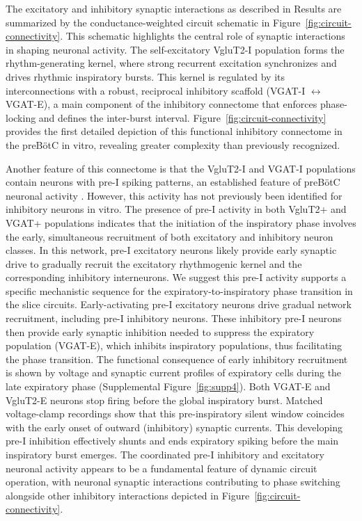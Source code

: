 \documentclass[
]{article}
\newcommand{\figref}[1]{Figure~\ref{#1}}
\newcommand{\suppfigref}[1]{Supplemental Figure~\ref{#1}}
\begin{document}
The excitatory and inhibitory synaptic interactions as described in Results are summarized by the conductance-weighted circuit schematic in \figref{fig:circuit-connectivity}. This schematic highlights the central role of synaptic interactions in shaping neuronal activity. The self-excitatory VgluT2-I population forms the rhythm-generating kernel, where strong recurrent excitation synchronizes and drives rhythmic inspiratory bursts. This kernel is regulated by its interconnections with a robust, reciprocal inhibitory scaffold (VGAT-I \(\leftrightarrow\) VGAT-E), a main component of the inhibitory connectome that enforces phase-locking and defines the inter-burst interval. \figref{fig:circuit-connectivity} provides the first detailed depiction of this functional inhibitory connectome in the preBötC in vitro, revealing greater complexity than previously recognized.

Another feature of this connectome is that the VgluT2-I and VGAT-I populations contain neurons with pre-I spiking patterns, an established feature of preBötC neuronal activity \citep[e.g.,][]{johnson1994pacemaker,butera1999coupled,delnegro2001experimental}. However, this activity has not previously been identified for inhibitory neurons in vitro. The presence of pre-I activity in both VgluT2+ and VGAT+ populations indicates that the initiation of the inspiratory phase involves the early, simultaneous recruitment of both excitatory and inhibitory neuron classes. In this network, pre-I excitatory neurons likely provide early synaptic drive to gradually recruit the excitatory rhythmogenic kernel and the corresponding inhibitory interneurons. We suggest this pre-I activity supports a specific mechanistic sequence for the expiratory-to-inspiratory phase transition in the slice circuits. Early-activating pre-I excitatory neurons drive gradual network recruitment, including pre-I inhibitory neurons. These inhibitory pre-I neurons then provide early synaptic inhibition needed to suppress the expiratory population (VGAT-E), which inhibits inspiratory populations, thus facilitating the phase transition. The functional consequence of early inhibitory recruitment is shown by voltage and synaptic current profiles of expiratory cells during the late expiratory phase (\suppfigref{fig:supp4}). Both VGAT-E and VgluT2-E neurons stop firing before the global inspiratory burst. Matched voltage-clamp recordings show that this pre-inspiratory silent window coincides with the early onset of outward (inhibitory) synaptic currents. This developing pre-I inhibition effectively shunts and ends expiratory spiking before the main inspiratory burst emerges. The coordinated pre-I inhibitory and excitatory neuronal activity appears to be a fundamental feature of dynamic circuit operation, with neuronal synaptic interactions contributing to phase switching alongside other inhibitory interactions depicted in \figref{fig:circuit-connectivity}.
\end{document}
